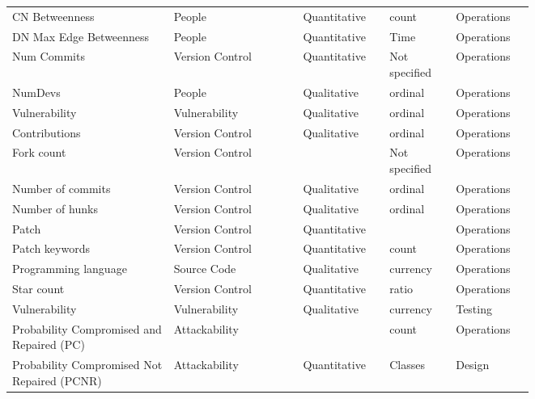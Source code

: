 \begin{tiny}
\begin{longtable}{@{}p{0.25\linewidth}p{0.15\linewidth}p{0.05\linewidth}p{0.1\linewidth}p{0.1\linewidth}p{0.1\linewidth}@{}}
CN Betweenness & People  & \cite{Meneely_Williams_2010} & Quantitative & count & Operations \\
DN Max Edge Betweenness & People  & \cite{Meneely_Williams_2010} & Quantitative & Time & Operations \\
Num Commits & Version Control  & \cite{Meneely_Williams_2010} & Quantitative & Not specified & Operations \\
NumDevs & People  & \cite{Meneely_Williams_2010} & Qualitative & ordinal & Operations \\
Vulnerability & Vulnerability  & \cite{Meneely_Williams_2010} & Qualitative & ordinal & Operations \\
Contributions & Version Control  & \cite{Perl_Dechand_Smith_Arp_Yamaguchi_Rieck_Fahl_Acar_2015} & Qualitative & ordinal & Operations \\
Fork count & Version Control  & \cite{Perl_Dechand_Smith_Arp_Yamaguchi_Rieck_Fahl_Acar_2015} &  & Not specified & Operations \\
Number of commits & Version Control  & \cite{Perl_Dechand_Smith_Arp_Yamaguchi_Rieck_Fahl_Acar_2015} & Qualitative & ordinal & Operations \\
Number of hunks & Version Control  & \cite{Perl_Dechand_Smith_Arp_Yamaguchi_Rieck_Fahl_Acar_2015} & Qualitative & ordinal & Operations \\
Patch & Version Control  & \cite{Perl_Dechand_Smith_Arp_Yamaguchi_Rieck_Fahl_Acar_2015} & Quantitative &  & Operations \\
Patch keywords & Version Control  & \cite{Perl_Dechand_Smith_Arp_Yamaguchi_Rieck_Fahl_Acar_2015} & Quantitative & count & Operations \\
Programming language & Source Code  & \cite{Perl_Dechand_Smith_Arp_Yamaguchi_Rieck_Fahl_Acar_2015} & Qualitative & currency & Operations \\
Star count & Version Control  & \cite{Perl_Dechand_Smith_Arp_Yamaguchi_Rieck_Fahl_Acar_2015} & Quantitative & ratio & Operations \\
Vulnerability & Vulnerability  & \cite{Perl_Dechand_Smith_Arp_Yamaguchi_Rieck_Fahl_Acar_2015} & Qualitative & currency & Testing \\
Probability Compromised and Repaired (PC) & Attackability & \cite{Marconato_Kaaniche_Nicomette_2013} &  & count & Operations \\
Probability Compromised Not Repaired (PCNR) & Attackability & \cite{Marconato_Kaaniche_Nicomette_2013} & Quantitative & Classes & Design \\

\end{longtable}
\end{tiny}
